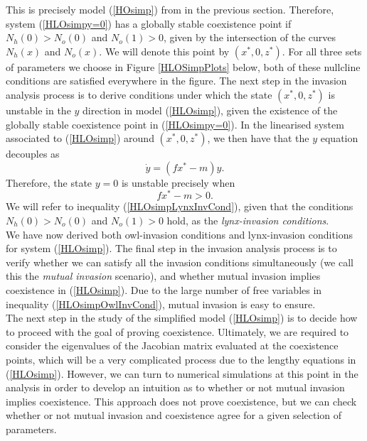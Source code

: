 \documentclass[12pt]{UOthesis}
\theoremstyle{remarkstyle}
\begin{document}
This is precisely model (\ref{HOsimp}) from in the previous section. Therefore, system (\ref{HLOsimpy=0}) has a globally stable coexistence point if $N_h(0)>N_o(0)$ and $N_o(1)>0$, given by the intersection of the curves $N_h(x)$ and $N_o(x)$. We will denote this point by $(x^*,0,z^*)$. For all three sets of parameters we choose in Figure \ref{HLOSimpPlots} below, both of these nullcline conditions are satisfied everywhere in the figure. The next step in the invasion analysis process is to derive conditions under which the state $\left(x^*,0,z^*\right)$ is unstable in the $y$ direction in model (\ref{HLOsimp}), given the existence of the globally stable coexistence point in (\ref{HLOsimpy=0}). In the linearised system associated to (\ref{HLOsimp}) around $(x^*,0,z^*)$, we then have that the $y$ equation decouples as
$$\dot{y}=(fx^*-m)y.$$
Therefore, the state $y=0$ is unstable precisely when
\begin{equation}
	fx^*-m>0.
	\label{HLOsimpLynxInvCond}
\end{equation}
We will refer to inequality (\ref{HLOsimpLynxInvCond}), given that the conditions $N_h(0)>N_o(0)$ and $N_o(1)>0$ hold, as the \textit{lynx-invasion conditions}.\\

We have now derived both owl-invasion conditions and lynx-invasion conditions for system (\ref{HLOsimp}). The final step in the invasion analysis process is to verify whether we can satisfy all the invasion conditions simultaneously (we call this the \textit{mutual invasion} scenario), and whether mutual invasion implies coexistence in (\ref{HLOsimp}). Due to the large number of free variables in inequality (\ref{HLOsimpOwlInvCond}), mutual invasion is easy to ensure.\\

The next step in the study of the simplified model (\ref{HLOsimp}) is to decide how to proceed with the goal of proving coexistence. Ultimately, we are required to consider the eigenvalues of the Jacobian matrix evaluated at the coexistence points, which will be a very complicated process due to the lengthy equations in (\ref{HLOsimp}). However, we can turn to numerical simulations at this point in the analysis in order to develop an intuition as to whether or not mutual invasion implies coexistence. This approach does not prove coexistence, but we can check whether or not mutual invasion and coexistence agree for a given selection of parameters.\\
\end{document}
